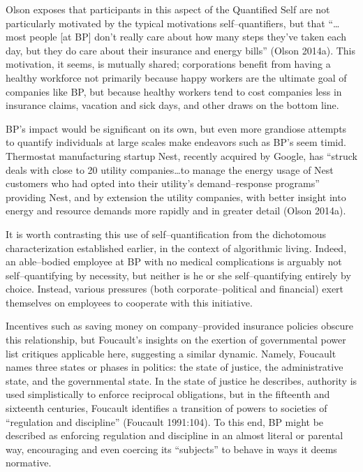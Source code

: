 \documentclass{article}
\begin{document}
Olson exposes that participants in this aspect of the Quantified Self are not particularly motivated by the typical motivations self--quantifiers,
but that ``\dots most people [at BP] don't really care about how many steps they've taken each day,
but they do care about their insurance and energy bills''
(Olson 2014a).
This motivation,
it seems,
is mutually shared;
corporations benefit from having a healthy workforce not primarily because happy workers are the ultimate goal of companies like BP,
but because healthy workers tend to cost companies less in insurance claims,
vacation and sick days,
and other draws on the bottom line.

BP's impact would be significant on its own,
but even more grandiose attempts to quantify individuals at large scales make endeavors such as BP's seem timid.
Thermostat manufacturing startup Nest,
recently acquired by Google,
has ``struck deals with close to 20 utility companies\dots to manage the energy usage of Nest customers who had opted into their utility's demand--response programs'' providing Nest,
and by extension the utility companies,
with better insight into energy and resource demands more rapidly and in greater detail
(Olson 2014a).

It is worth contrasting this use of self--quantification from the dichotomous characterization established earlier,
in the context of algorithmic living.
Indeed,
an able--bodied employee at BP with no medical complications is arguably not self--quantifying by necessity,
but neither is he or she self--quantifying entirely by choice.
Instead,
various pressures (both corporate--political and financial) exert themselves on employees to cooperate with this initiative.

Incentives such as saving money on company--provided insurance policies obscure this relationship,
but Foucault's insights on the exertion of governmental power list critiques applicable here,
suggesting a similar dynamic.
Namely,
Foucault names three states or phases in politics:
the state of justice,
the administrative state,
and the governmental state.
In the state of justice he describes,
authority is used simplistically to enforce reciprocal obligations,
but in the fifteenth and sixteenth centuries,
Foucault identifies a transition of powers to societies of ``regulation and discipline''
(Foucault 1991:104).
To this end,
BP might be described as enforcing regulation and discipline in an almost literal or parental way,
encouraging and even coercing its ``subjects'' to behave in ways it deems normative.
\end{document}
